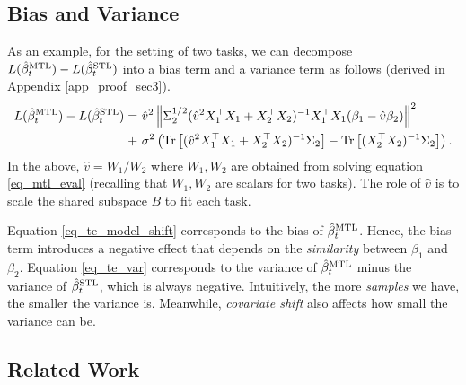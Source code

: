 \subsection{Bias and Variance}

As an example, for the setting of two tasks, we can decompose $L(\hat{\beta}_t^{\text{MTL}}) - L(\hat{\beta}_t^{\text{STL}})$ into a bias term and a variance term as follows (derived in Appendix \ref{app_proof_sec3}).
{\small\begin{align}
	L(\hat{\beta}_t^{\text{MTL}}) - L(\hat{\beta}_t^{\text{STL}}) =& ~ \hat{v}^2 \left\| \Sigma_2^{1/2} (\hat{v}^2 X_1^{\top}X_1 + X_2^{\top}X_2)^{-1}X_1^{\top}X_1 (\beta_1 - \hat{v}\beta_2) \right\|^2 \label{eq_te_model_shift} \\
	+&~ \sigma^2 \left({\operatorname{Tr}\left[(\hat{v}^2 X_1^{\top}X_1 + X_2^{\top}X_2)^{-1}\Sigma_2\right] - \operatorname{Tr}\left[(X_2^{\top}X_2)^{-1}\Sigma_2\right]}\right). \label{eq_te_var}
\end{align}}%
In the above, $\hat{v} = W_1 / W_2$ where $W_1, W_2$ are obtained from solving equation \eqref{eq_mtl_eval} (recalling that $W_1, W_2$ are scalars for two tasks).
The role of $\hat{v}$ is to scale the shared subspace $B$ to fit each task.

Equation \eqref{eq_te_model_shift} corresponds to the bias of $\hat{\beta}_t^{\text{MTL}}$.
Hence, the bias term introduces a negative effect that depends on the \textit{similarity} between $\beta_1$ and $\beta_2$.
Equation \eqref{eq_te_var} corresponds to the variance of $\hat{\beta}_t^{\text{MTL}}$ minus the variance of $\hat{\beta}_t^{\text{STL}}$, which is always negative.
Intuitively, the more \textit{samples} we have, the smaller the variance is.
Meanwhile, \textit{covariate shift} also affects how small the variance can be.


\subsection{Related Work}

